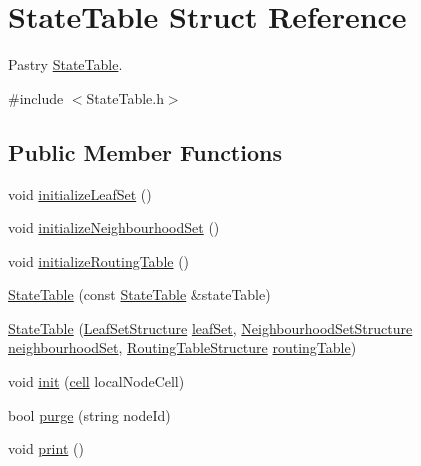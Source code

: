 \hypertarget{structStateTable}{\section{State\-Table Struct Reference}
\label{structStateTable}
}


Pastry \hyperlink{structStateTable}{State\-Table}.  




{\ttfamily \#include $<$State\-Table.\-h$>$}

\subsection*{Public Member Functions}
\begin{DoxyCompactItemize}
\item 
void \hyperlink{structStateTable_a43e620d28a500e76ba749836cc56fc49}{initialize\-Leaf\-Set} ()
\item 
void \hyperlink{structStateTable_ab3a1936562d8b660297923ad1e924c75}{initialize\-Neighbourhood\-Set} ()
\item 
void \hyperlink{structStateTable_a3ea707fb80290726b1d48a6a2023a76f}{initialize\-Routing\-Table} ()
\item 
\hyperlink{structStateTable_a0154fd15c269f0d8684c05bfdd217985}{State\-Table} (const \hyperlink{structStateTable}{State\-Table} \&state\-Table)
\item 
\hyperlink{structStateTable_a86b43a8ebb43361b69d43fac1b0c5b2b}{State\-Table} (\hyperlink{structLeafSetStructure}{Leaf\-Set\-Structure} \hyperlink{structStateTable_a1fc9c824d5a46581e41be343ed413a33}{leaf\-Set}, \hyperlink{structNeighbourhoodSetStructure}{Neighbourhood\-Set\-Structure} \hyperlink{structStateTable_a85564c6deec324c3db3263ca08263f63}{neighbourhood\-Set}, \hyperlink{structRoutingTableStructure}{Routing\-Table\-Structure} \hyperlink{structStateTable_a8ccc728c639db2384c4eed11a8f3d484}{routing\-Table})
\item 
void \hyperlink{structStateTable_a06d157dd4a20b752bb5333eea73b1c8a}{init} (\hyperlink{structcell}{cell} local\-Node\-Cell)
\item 
bool \hyperlink{structStateTable_a09249e1c4eb2645031d086adad2bca37}{purge} (string node\-Id)
\item 
void \hyperlink{structStateTable_a4198a3d6d611263eaf56c74b0582a00d}{print} ()
\end{DoxyCompactItemize}

